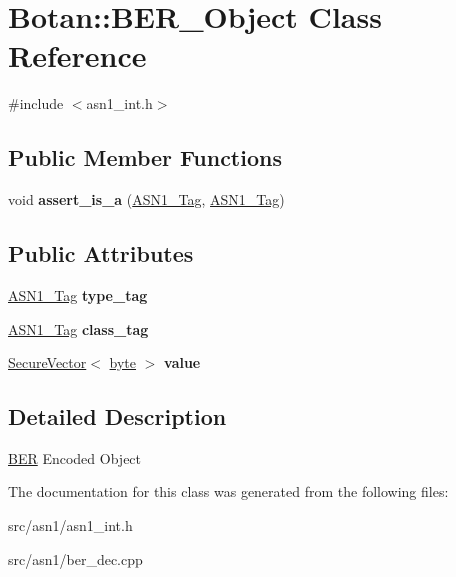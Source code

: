 \hypertarget{classBotan_1_1BER__Object}{\section{Botan\-:\-:B\-E\-R\-\_\-\-Object Class Reference}
\label{classBotan_1_1BER__Object}
}


{\ttfamily \#include $<$asn1\-\_\-int.\-h$>$}

\subsection*{Public Member Functions}
\begin{DoxyCompactItemize}
\item 
\hypertarget{classBotan_1_1BER__Object_a55bd9ed3be02cb87ae5c305953e28898}{void {\bfseries assert\-\_\-is\-\_\-a} (\hyperlink{namespaceBotan_aaa08f67a945ef195fa39e62659dffa7a}{A\-S\-N1\-\_\-\-Tag}, \hyperlink{namespaceBotan_aaa08f67a945ef195fa39e62659dffa7a}{A\-S\-N1\-\_\-\-Tag})}\label{classBotan_1_1BER__Object_a55bd9ed3be02cb87ae5c305953e28898}

\end{DoxyCompactItemize}
\subsection*{Public Attributes}
\begin{DoxyCompactItemize}
\item 
\hypertarget{classBotan_1_1BER__Object_a679853fe0d1fa751bc0c63c0100408e7}{\hyperlink{namespaceBotan_aaa08f67a945ef195fa39e62659dffa7a}{A\-S\-N1\-\_\-\-Tag} {\bfseries type\-\_\-tag}}\label{classBotan_1_1BER__Object_a679853fe0d1fa751bc0c63c0100408e7}

\item 
\hypertarget{classBotan_1_1BER__Object_a499f199fca77962e0d5fe5e38833b2b9}{\hyperlink{namespaceBotan_aaa08f67a945ef195fa39e62659dffa7a}{A\-S\-N1\-\_\-\-Tag} {\bfseries class\-\_\-tag}}\label{classBotan_1_1BER__Object_a499f199fca77962e0d5fe5e38833b2b9}

\item 
\hypertarget{classBotan_1_1BER__Object_a0e089581f129068b8607c1a2702bd7e3}{\hyperlink{classBotan_1_1SecureVector}{Secure\-Vector}$<$ \hyperlink{namespaceBotan_a7d793989d801281df48c6b19616b8b84}{byte} $>$ {\bfseries value}}\label{classBotan_1_1BER__Object_a0e089581f129068b8607c1a2702bd7e3}

\end{DoxyCompactItemize}


\subsection{Detailed Description}
\hyperlink{namespaceBotan_1_1BER}{B\-E\-R} Encoded Object 

The documentation for this class was generated from the following files\-:\begin{DoxyCompactItemize}
\item 
src/asn1/asn1\-\_\-int.\-h\item 
src/asn1/ber\-\_\-dec.\-cpp\end{DoxyCompactItemize}
